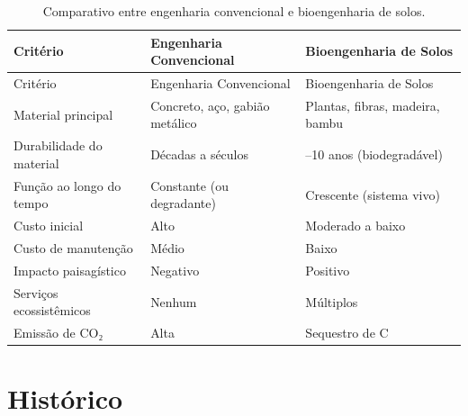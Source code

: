\documentclass[
  portuguese,
  11pt,
  a4paper,
  open=any]{scrbook}
\begin{document}
\begin{longtable}[]{@{}
  >{\raggedright\arraybackslash}p{}
  >{\raggedright\arraybackslash}p{}
  >{\raggedright\arraybackslash}p{}@{}}
\caption{Comparativo entre engenharia convencional e bioengenharia de
solos.}\label{tbl-comparativo}\tabularnewline
\toprule\noalign{}
\begin{minipage}[b]{\linewidth}\raggedright
Critério
\end{minipage} & \begin{minipage}[b]{\linewidth}\raggedright
Engenharia Convencional
\end{minipage} & \begin{minipage}[b]{\linewidth}\raggedright
Bioengenharia de Solos
\end{minipage} \\
\midrule\noalign{}
\endfirsthead
\toprule\noalign{}
\begin{minipage}[b]{\linewidth}\raggedright
Critério
\end{minipage} & \begin{minipage}[b]{\linewidth}\raggedright
Engenharia Convencional
\end{minipage} & \begin{minipage}[b]{\linewidth}\raggedright
Bioengenharia de Solos
\end{minipage} \\
\midrule\noalign{}
\endhead
\bottomrule\noalign{}
\endlastfoot
Material principal & Concreto, aço, gabião metálico & Plantas, fibras,
madeira, bambu \\
Durabilidade do material & Décadas a séculos & 2--10 anos
(biodegradável) \\
Função ao longo do tempo & Constante (ou degradante) & Crescente
(sistema vivo) \\
Custo inicial & Alto & Moderado a baixo \\
Custo de manutenção & Médio & Baixo \\
Impacto paisagístico & Negativo & Positivo \\
Serviços ecossistêmicos & Nenhum & Múltiplos \\
Emissão de CO₂ & Alta & Sequestro de C \\
\end{longtable}

\section{Histórico}\label{histuxf3rico}
\end{document}
